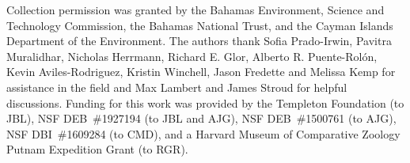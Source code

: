 Collection permission was granted by the Bahamas Environment, Science and Technology Commission, the Bahamas National Trust, and the Cayman Islands Department of the Environment. The authors thank Sofia Prado-Irwin, Pavitra Muralidhar, Nicholas Herrmann, Richard E. Glor, Alberto R. Puente-Rol\'{o}n, Kevin Aviles-Rodriguez, Kristin Winchell, Jason Fredette and Melissa Kemp for assistance in the field and Max Lambert and James Stroud for helpful discussions. Funding for this work was provided by the Templeton Foundation (to JBL), NSF DEB~\#1927194 (to JBL and AJG), NSF DEB~\#1500761 (to AJG), NSF DBI~\#1609284 (to CMD), and a Harvard Museum of Comparative Zoology Putnam Expedition Grant (to RGR).